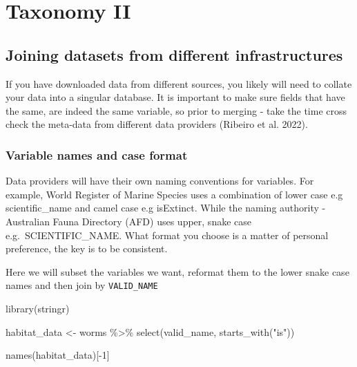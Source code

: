 \documentclass[
  letterpaper,
  DIV=11,
  numbers=noendperiod,
  oneside]{scrreprt}
\newenvironment{Shaded}{\begin{snugshade}}{\end{snugshade}}
\newcommand{\DecValTok}[1]{\textcolor[rgb]{0.68,0.00,0.00}{#1}}
\newcommand{\FunctionTok}[1]{\textcolor[rgb]{0.28,0.35,0.67}{#1}}
\newcommand{\NormalTok}[1]{\textcolor[rgb]{0.00,0.23,0.31}{#1}}
\newcommand{\OtherTok}[1]{\textcolor[rgb]{0.00,0.23,0.31}{#1}}
\newcommand{\SpecialCharTok}[1]{\textcolor[rgb]{0.37,0.37,0.37}{#1}}
\newcommand{\StringTok}[1]{\textcolor[rgb]{0.13,0.47,0.30}{#1}}
\begin{document}

\hypertarget{taxonomy-ii}{%
\chapter{Taxonomy II}\label{taxonomy-ii}}

\hypertarget{joining-datasets-from-different-infrastructures}{%
\section{Joining datasets from different
infrastructures}\label{joining-datasets-from-different-infrastructures}}

If you have downloaded data from different sources, you likely will need
to collate your data into a singular database. It is important to make
sure fields that have the same, are indeed the same variable, so prior
to merging - take the time cross check the meta-data from different data
providers (Ribeiro et al. 2022).

\hypertarget{variable-names-and-case-format}{%
\subsection{Variable names and case
format}\label{variable-names-and-case-format}}

Data providers will have their own naming conventions for variables. For
example, World Register of Marine Species uses a combination of lower
case e.g scientific\_name and camel case e.g isExtinct. While the naming
authority - Australian Fauna Directory (AFD) uses upper, snake case
e.g.~SCIENTIFIC\_NAME. What format you choose is a matter of personal
preference, the key is to be consistent.

Here we will subset the variables we want, reformat them to the lower
snake case names and then join by \texttt{VALID\_NAME}

\begin{Shaded}
\begin{Highlighting}[]
\FunctionTok{library}\NormalTok{(stringr)}

\NormalTok{habitat\_data }\OtherTok{\textless{}{-}}\NormalTok{ worms }\SpecialCharTok{\%\textgreater{}\%} 
  \FunctionTok{select}\NormalTok{(valid\_name, }\FunctionTok{starts\_with}\NormalTok{(}\StringTok{"is"}\NormalTok{)) }

\FunctionTok{names}\NormalTok{(habitat\_data)[}\SpecialCharTok{{-}}\DecValTok{1}\NormalTok{] }
\end{Highlighting}
\end{Shaded}
\end{document}
